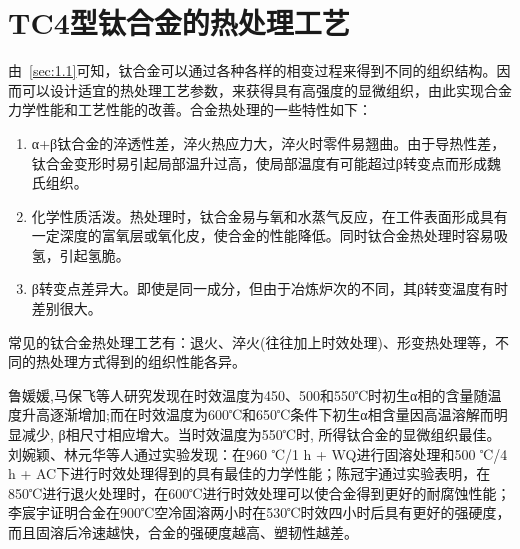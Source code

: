 \section{TC4型钛合金的热处理工艺}
由~\ref{sec:1.1}可知，钛合金可以通过各种各样的相变过程来得到不同的组织结构。因而可以设计适宜的热处理工艺参数，来获得具有高强度的显微组织，由此实现\ti 合金力学性能和工艺性能的改善。\ti 合金热处理的一些特性如下：
\begin{enumerate}
	\item α+β钛合金的淬透性差，淬火热应力大，淬火时零件易翘曲。由于导热性差，钛合金变形时易引起局部温升过高，使局部温度有可能超过β转变点而形成魏氏组织。
	\item 化学性质活泼。热处理时，钛合金易与氧和水蒸气反应，在工件表面形成具有一定深度的富氧层或氧化皮，使合金的性能降低。同时钛合金热处理时容易吸氢，引起氢脆。
	\item β转变点差异大。即使是同一成分，但由于冶炼炉次的不同，其β转变温度有时差别很大。
\end{enumerate}

常见的\ti 钛合金热处理工艺有：退火、淬火(往往加上时效处理)、形变热处理等，不同的热处理方式得到的组织性能各异。

 鲁媛媛,马保飞等人研究发现在时效温度为450、500和550℃时初生α相的含量随温度升高逐渐增加;而在时效温度为600℃和650℃条件下初生α相含量因高温溶解而明显减少, β相尺寸相应增大。当时效温度为550℃时, 所得钛合金的显微组织最佳\cite{luyuanyuanShixiaochuliduiTC4taihejinweiguanzuzhihelixuexingnengdeyingxiang2019}。刘婉颖、林元华等人通过实验发现：在960 ℃/1 h + WQ进行固溶处理和500 ℃/4 h + AC下进行时效处理得到的\ti 具有最佳的力学性能\cite{LiuWanYingBuTongReChuLiGongYiDuiTi6Al4VTaiHeJinWeiGuanJieGouHeLiXueXingNengYingXiangYingWen2017}；陈冠宇通过实验表明，在850℃进行退火处理时，在600℃进行时效处理可以使合金得到更好的耐腐蚀性能\cite{1200}；李宸宇证明\ti 合金在900℃空冷固溶两小时在530℃时效四小时后具有更好的强硬度，而且固溶后冷速越快，合金的强硬度越高、塑韧性越差\cite{900}。%



